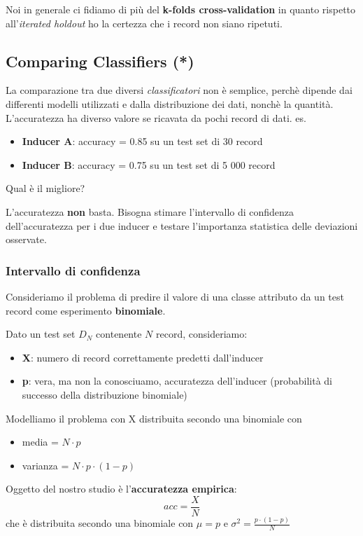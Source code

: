 Noi in generale ci fidiamo di pi\`u del \textbf{k-folds cross-validation} in quanto rispetto all'\textit{iterated holdout} ho la certezza che i record non siano ripetuti.

\subsection{Comparing Classifiers (*)}
La comparazione tra due diversi \textit{classificatori} non è semplice, perchè dipende dai differenti modelli utilizzati e dalla distribuzione dei dati, nonchè la quantità. L'accuratezza ha diverso valore se ricavata da pochi record di dati. 
es. 
\begin{itemize}
	\item \textbf{Inducer A}: accuracy = 0.85 su un test set di 30 record
	\item \textbf{Inducer B}: accuracy = 0.75 su un test set di 5 000 record
\end{itemize}
Qual è il migliore?

L'accuratezza \textbf{non} basta. Bisogna stimare l'intervallo di confidenza dell'accuratezza per i due inducer e testare l'importanza statistica delle deviazioni osservate.
 
\subsubsection{Intervallo di confidenza}
Consideriamo il problema di predire il valore di una classe attributo da un test record come esperimento \textbf{binomiale}.

Dato un test set $D_N$ contenente $N$ record, consideriamo:
\begin{itemize}
	\item \textbf{X}: numero di record correttamente predetti dall'inducer
	\item \textbf{p}: vera, ma non la conosciuamo, accuratezza dell'inducer (probabilit\`a di successo della distribuzione binomiale)
\end{itemize}
Modelliamo il problema con X distribuita secondo una binomiale con
\begin{itemize}
	\item media = $N \cdot p$
	\item varianza = $N \cdot p \cdot (1-p)$
\end{itemize}
Oggetto del nostro studio \`e l'\textbf{accuratezza empirica}: \[acc = \frac{X}{N} \] 
che \`e distribuita secondo una binomiale con $\mu = p$ e $\sigma^2 = \frac{p \cdot (1-p)}{N}$

